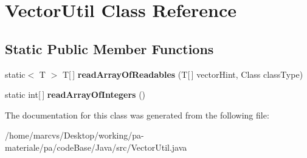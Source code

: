 \hypertarget{classVectorUtil}{
\section{VectorUtil Class Reference}
\label{classVectorUtil}
}
\subsection*{Static Public Member Functions}
\begin{DoxyCompactItemize}
\item 
\hypertarget{classVectorUtil_aff4c2878342ce74cd1dbed299fa16678}{
static$<$ T $>$ T\mbox{[}$\,$\mbox{]} {\bfseries readArrayOfReadables} (T\mbox{[}$\,$\mbox{]} vectorHint, Class classType)}
\label{classVectorUtil_aff4c2878342ce74cd1dbed299fa16678}

\item 
\hypertarget{classVectorUtil_a872045ae05e75378562d354bf14df5dd}{
static int\mbox{[}$\,$\mbox{]} {\bfseries readArrayOfIntegers} ()}
\label{classVectorUtil_a872045ae05e75378562d354bf14df5dd}

\end{DoxyCompactItemize}


The documentation for this class was generated from the following file:\begin{DoxyCompactItemize}
\item 
/home/marcvs/Desktop/working/pa-\/materiale/pa/codeBase/Java/src/VectorUtil.java\end{DoxyCompactItemize}
